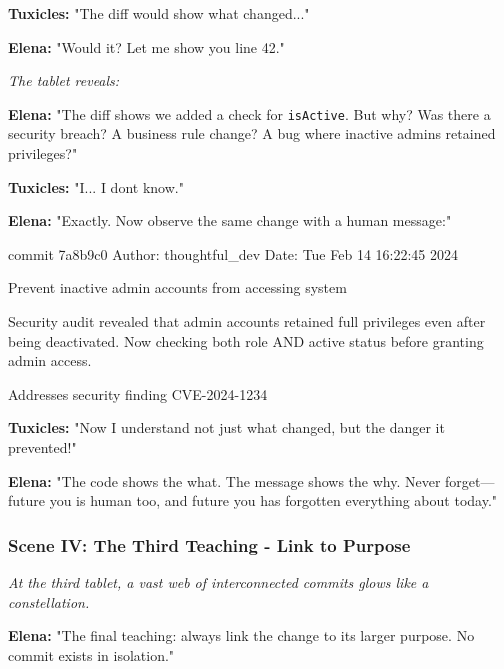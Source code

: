 \textbf{Tuxicles:} "The diff would show what changed..."

\textbf{Elena:} "Would it? Let me show you line 42."

\emph{The tablet reveals:}

\begin{codeblock}
- if (user.role == "admin") {
+ if (user.role === "admin" && user.isActive) {
\end{codeblock}

\textbf{Elena:} "The diff shows we added a check for \texttt{isActive}. But why? Was there a security breach? A business rule change? A bug where inactive admins retained privileges?"

\textbf{Tuxicles:} "I... I don\textquotesingle t know."

\textbf{Elena:} "Exactly. Now observe the same change with a human message:"

\begin{codeblock}
commit 7a8b9c0
Author: thoughtful_dev  
Date: Tue Feb 14 16:22:45 2024

Prevent inactive admin accounts from accessing system

Security audit revealed that admin accounts retained full
privileges even after being deactivated. Now checking both
role AND active status before granting admin access.

Addresses security finding CVE-2024-1234
\end{codeblock}

\textbf{Tuxicles:} "Now I understand not just what changed, but the danger it prevented!"

\textbf{Elena:} "The code shows the \textquotesingle what.\textquotesingle{} The message shows the \textquotesingle why.\textquotesingle{} Never forget---future you is human too, and future you has forgotten everything about today."

\bookdivider

\subsubsection{Scene IV: The Third Teaching - Link to Purpose}\label{scene-iv-the-third-teaching---link-to-purpose}

\emph{At the third tablet, a vast web of interconnected commits glows like a constellation.}

\textbf{Elena:} "The final teaching: always link the change to its larger purpose. No commit exists in isolation."

